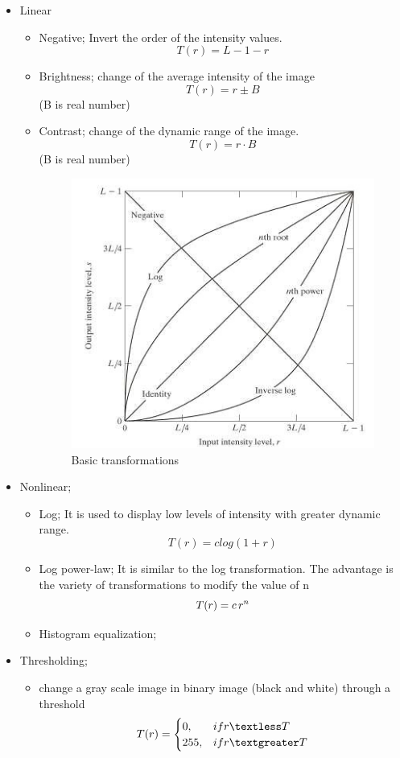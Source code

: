 \begin{itemize}
	\item Linear
		\begin{itemize}
			\item Negative; Invert the order of the intensity values. 
				\[
					T(r){=}L-1-r
				\]
			\item Brightness; change of the average intensity of the image 
				\[
					T(r)=r \pm B 				
				\]	
				(B is real number)
			\item Contrast; change of the dynamic range of the image. 
				\[
					T(r)=r \cdot B 
				\]		
				(B is real number)
				\begin{figure}
					\centering
					\includegraphics[scale=1]{images/ch2/basicTransformation.jpg}
					\caption{Basic transformations}
					\label{fig:basicTransformation}
				\end{figure}						
		\end{itemize}
		\item Nonlinear;
			\begin{itemize}
				\item Log; It is used to display low levels of intensity with greater dynamic range.
					\[
						T(r)=c log(1+r)
					\]
				\item Log power-law; It is similar to the log transformation. The advantage is the variety of  transformations to modify the value of n 
					\[
						T(r)=c \thinspace r^n
					\]									
				\item Histogram equalization;	
			\end{itemize}			
		\item Thresholding;
			\begin{itemize}
				\item change a gray scale image in binary image (black and white) through a threshold
					\[
						T(r)=
							\begin{cases}
								0,&if r \textless T\\
								255,&if r \textgreater T
							\end{cases}
					\]
			\end{itemize}
\end{itemize}

